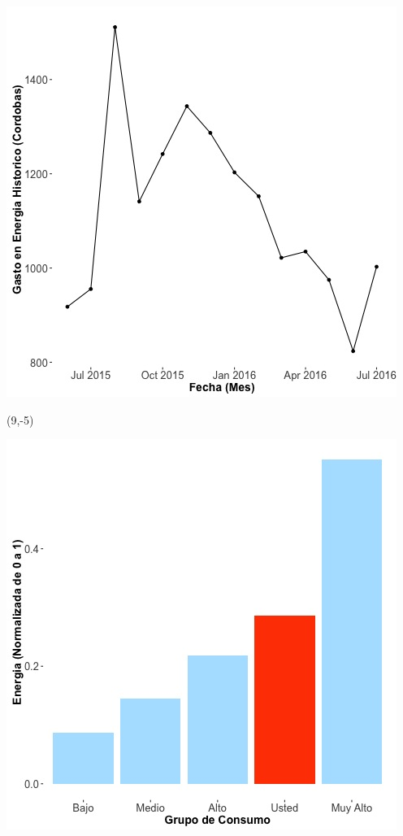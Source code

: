 \documentclass{article}\usepackage[]{graphicx}\usepackage[]{color}
\newenvironment{knitrout}{}{} %
\begin{document}
\begin{knitrout}
\color{fgcolor}
\includegraphics[scale=0.65]{figure/A3_historico_cordobas} 
\end{knitrout}

 \begin{textblock}{1}(9,-5)
\begin{minipage}{20em}
\begingroup

\endgroup
\end{minipage}
\end{textblock}


\begin{knitrout}
\color{fgcolor}
\includegraphics[scale=0.65]{figure/A3_neighbor_plot} 
\end{knitrout}
\end{document}
